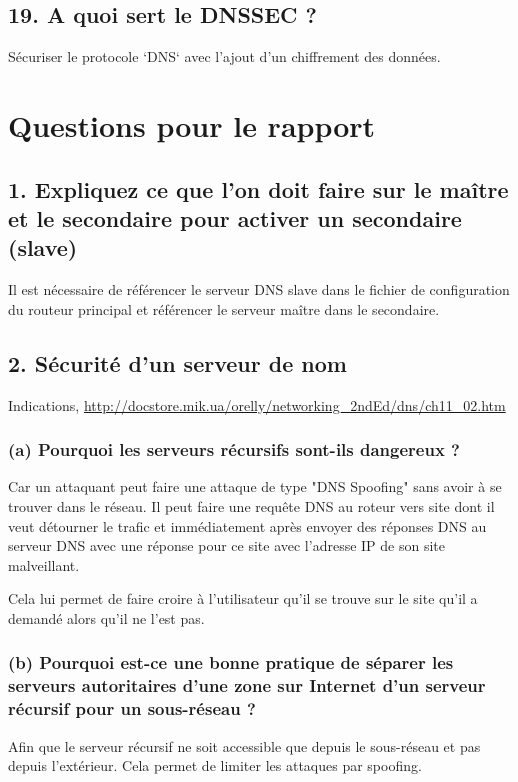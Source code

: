 \documentclass{article}
\begin{document}
\subsection*{19. A quoi sert le DNSSEC ?}
Sécuriser le protocole `DNS` avec l'ajout d'un chiffrement des données.



\section{Questions pour le rapport}
\subsection*{1. Expliquez ce que l’on doit faire sur le maître et le secondaire pour activer un secondaire (slave)}
Il est nécessaire de référencer le serveur DNS slave dans le fichier de configuration du routeur principal et référencer le serveur maître dans le secondaire.

\subsection*{2. Sécurité d’un serveur de nom}
Indications,  \url{http://docstore.mik.ua/orelly/networking_2ndEd/dns/ch11_02.htm}

\subsubsection*{(a) Pourquoi les serveurs récursifs sont-ils dangereux ?}
Car un attaquant peut faire une attaque de type "DNS Spoofing" sans avoir à se trouver dans le réseau. Il peut faire une requête DNS au roteur vers site dont il veut détourner le trafic et immédiatement après envoyer des réponses DNS au serveur DNS avec une réponse pour ce site avec l'adresse IP de son site malveillant.

Cela lui permet de faire croire à l'utilisateur qu'il se trouve sur le site qu'il a demandé alors qu'il ne l'est pas.

\subsubsection*{(b) Pourquoi est-ce une bonne pratique de séparer les serveurs autoritaires d’une zone sur Internet d’un serveur récursif pour un sous-réseau ?}
Afin que le serveur récursif ne soit accessible que depuis le sous-réseau et pas depuis l'extérieur. Cela permet de limiter les attaques par spoofing.
\end{document}
